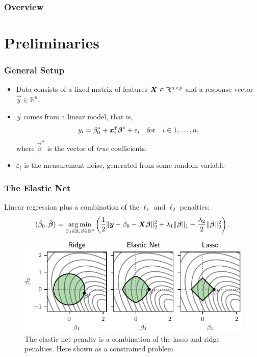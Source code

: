 \documentclass[10pt]{beamer}
\begin{document}
\begin{frame}
  \frametitle{Overview}

  \tableofcontents
\end{frame}

\section{Preliminaries}

\begin{frame}
  \frametitle{General Setup}

  \begin{itemize}
    \item Data consists of a \alert{fixed} matrix of features \(\boldsymbol{X} \in \mathbb{R}^{n \times p}\)
          and a response vector \(\vec{y} \in \mathbb{R}^n\).
    \item \(\vec{y}\) comes from a linear model, that is,
          \[
            y_i = \beta_0^* + \boldsymbol x_i^\intercal \boldsymbol\beta^* + \varepsilon_i \quad\text{for} \quad i \in 1,\dots,n,
          \]
          where \(\vec{\beta}^*\) is the vector of \emph{true} coefficients.
    \item \(\varepsilon_i\) is the measurement noise, generated from some random variable
  \end{itemize}
\end{frame}

\begin{frame}[c]
  \frametitle{The Elastic Net}

  Linear regression plus a combination of the \(\ell_1\) and \(\ell_2\) penalties:
  \begin{equation*}
    (\hat{\beta}_0, \hat{\boldsymbol{\beta}}) = \operatorname*{arg\,min}_{\beta_0 \in \mathbb{R},\beta \in \mathbb{R}^p} \left( \frac{1}{2} \lVert \boldsymbol y - \beta_0 - \boldsymbol{X}\boldsymbol{\beta} \rVert^2_2  + \lambda_1 \lVert \boldsymbol\beta \rVert_1 + \frac{\lambda_2}{2}\lVert \boldsymbol \beta \rVert_2^2\right).
  \end{equation*}

  \pause

  \begin{figure}
    \centering
    \includegraphics[]{figures/elasticnet-balls.pdf}
    \caption{%
      The elastic net penalty is a combination of the lasso and ridge penalties. Here shown as a constrained problem.
    }
  \end{figure}

\end{frame}
\end{document}
